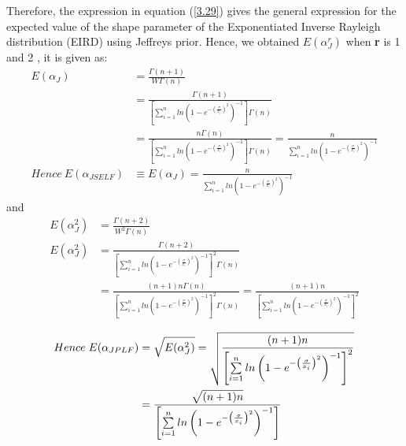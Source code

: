 \documentclass[a4paper,12pt]{report}
\newcommand{\para}{\hspace{0.5cm}}
\begin{document}
\noindent\para Therefore, the expression in equation (\ref{3.29}) gives the general expression for the expected value of the shape parameter of the Exponentiated Inverse Rayleigh distribution (EIRD) using Jeffreys prior. Hence, we obtained $E(\alpha_J^r)$ when \textbf{r} is 1 and 2 , it is given as:
\begin{equation}\label{3.30}
\begin{split}
E(\alpha_J) &= \frac{\Gamma(n+1)}{W\Gamma(n)}\\
&=\frac{\Gamma(n+1)}{\left[\sum\limits_{ i=1 }^{n}ln\left(1-e^{-\left(\frac{\sigma}{x_i}\right)^2}\right)^{-1}\right]\Gamma(n)}\\
&=\frac{n\Gamma(n)}{\left[\sum\limits_{ i=1 }^{n}ln\left(1-e^{-\left(\frac{\sigma}{x_i}\right)^2}\right)^{-1}\right]\Gamma(n)}=\frac{n}{\sum\limits_{ i=1 }^{n}ln\left(1-e^{-\left(\frac{\sigma}{x_i}\right)^2}\right)^{-1}}\\
Hence\ E(\alpha_{JSELF})&\equiv E(\alpha_J)=\frac{n}{\sum\limits_{ i=1 }^{n}ln\left(1-e^{-\left(\frac{\sigma}{x_i}\right)^2}\right)^{-1}}
\end{split}
\end{equation}
and
\[\begin{split}
E(\alpha_{J}^2) &= \frac{\Gamma(n+2)}{W^2\Gamma(n)}\\
E(\alpha_J^2) &= \frac{\Gamma(n+2)}{\left[\sum\limits_{ i=1 }^{n}ln\left(1-e^{-\left(\frac{\sigma}{x_i}\right)^2}\right)^{-1}\right]^2\Gamma(n)}\\
&=\frac{(n+1)n\Gamma(n)}{\left[\sum\limits_{ i=1 }^{n}ln\left(1-e^{-\left(\frac{\sigma}{x_i}\right)^2}\right)^{-1}\right]^2\Gamma(n)}=\frac{(n+1)n}{\left[\sum\limits_{ i=1 }^{n}ln\left(1-e^{-\left(\frac{\sigma}{x_i}\right)^2}\right)^{-1}\right]^2}\\
\end{split}\]
\begin{equation}\label{3.31}
\begin{split}\footnotesize
Hence \ E(\alpha_{JPLF})&=\sqrt{E(\alpha_{J}^2)}=\sqrt{\frac{(n+1)n}{\left[\sum\limits_{ i=1 }^{n}ln\left(1-e^{-\left(\frac{\sigma}{x_i}\right)^2}\right)^{-1}\right]^2}}\\
&=\frac{\sqrt{(n+1)n}}{\left[\sum\limits_{ i=1 }^{n}ln\left(1-e^{-\left(\frac{\sigma}{x_i}\right)^2}\right)^{-1}\right]}
\end{split}
\end{equation}
\end{document}
